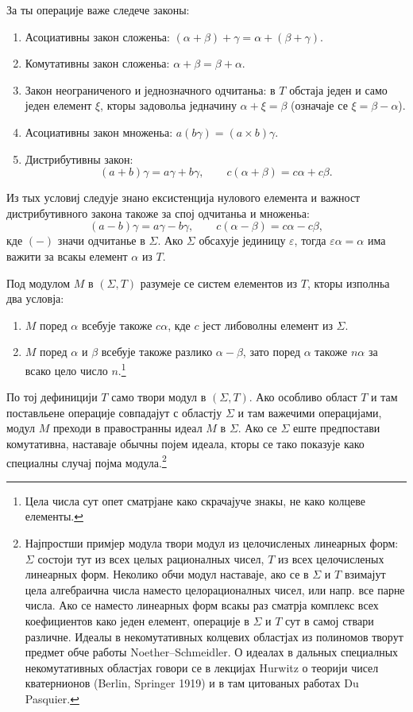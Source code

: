 ﻿\documentclass[11pt]{article}
\begin{document}
За ты операције важе следече законы:
\begin{enumerate}
\item Асоциативны закон сложеньа: \((\alpha+\beta)+\gamma=\alpha+(\beta+\gamma)\).
\item Комутативны закон сложеньа: \(\alpha+\beta=\beta+\alpha\).
\item Закон неограниченого и једнозначного одчитаньа: в \(T\) обстаја једен и само једен елемент \(\xi\), кторы задовольа једначину \(\alpha+\xi=\beta\) (означаје се \(\xi=\beta-\alpha\)).
\item Асоциативны закон множеньа: \(a(b\gamma)=(a\times b)\gamma\).
\item Дистрибутивны закон:
\[
 (a+b)\gamma=a\gamma+b\gamma,\qquad c(\alpha+\beta)=c\alpha+c\beta.
\]
\end{enumerate}
Из тых условиј следује знано ексистенција нулового елемента и важност дистрибутивного закона такоже за спој одчитаньа и множеньа:
\[
 (a-b)\gamma=a\gamma-b\gamma,\qquad c(\alpha-\beta)=c\alpha-c\beta,
\]
кде \((-)\) значи одчитанье в \(\Sigma\). Ако \(\Sigma\) обсахује јединицу \(\varepsilon\), тогда \(\varepsilon\alpha=\alpha\) има важити за всакы елемент \(\alpha\) из \(T\).

Под модулом \(M\) в \((\Sigma,T)\) разумеје се систем елементов из \(T\), кторы изполньа два условја:
\begin{enumerate}
\item \(M\) поред \(\alpha\) всебује такоже \(c\alpha\), кде \(c\) јест либоволны елемент из \(\Sigma\).
\item \(M\) поред \(\alpha\) и \(\beta\) всебује такоже разлико \(\alpha-\beta\), зато поред \(\alpha\) такоже \(n\alpha\) за всако цело число \(n\).\footnote{Цела числа сут опет сматрјане како скрачајуче знакы, не како колцеве елементы.}
\end{enumerate}
По тој дефиницији \(T\) само твори модул в \((\Sigma,T)\). Ако особливо област \(T\) и там поставльене операције совпадајут с областју \(\Sigma\) и там важечими операцијами, модул \(M\) преходи в правостранны идеал \(M\) в \(\Sigma\). Ако се \(\Sigma\) еште предпостави комутативна, наставаје обычны појем идеала, кторы се тако показује како специалны случај појма модула.\footnote{Најпростши примјер модула твори модул из целочисленых линеарных форм: \(\Sigma\) состоји тут из всех целых рационалных чисел, \(T\) из всех целочисленых линеарных форм. Неколико обчи модул наставаје, ако се в \(\Sigma\) и \(T\) взимајут цела алгебраична числа наместо целорационалных чисел, или напр. все парне числа. Ако се наместо линеарных форм всакы раз сматрја комплекс всех коефициентов како једен елемент, операције в \(\Sigma\) и \(T\) сут в самој ствари различне. Идеалы в некомутативных колцевих областјах из полиномов творут предмет обче работы Noether--Schmeidler. О идеалах в дальных специалных некомутативных областјах говори се в лекцијах Hurwitz о теорији чисел кватернионов (Berlin, Springer 1919) и в там цитованых работах Du Pasquier.}
\end{document}
